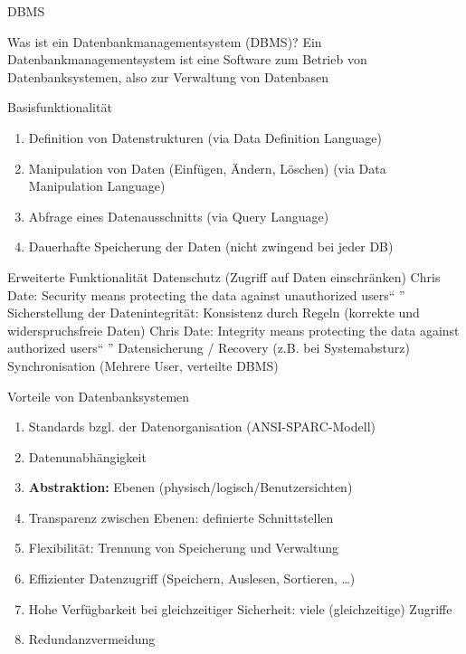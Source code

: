 

\begin{frame}[allowframebreaks]{DBMS}
\begin{alertblock}{Was ist ein Datenbankmanagementsystem (DBMS)?}
Ein Datenbankmanagementsystem ist eine Software zum Betrieb von
Datenbanksystemen, also zur Verwaltung von Datenbasen
\end{alertblock}

\begin{exampleblock}{Basisfunktionalität}
\begin{enumerate}
    \item Definition von Datenstrukturen (via Data Definition Language)
    \item Manipulation von Daten (Einfügen, Ändern, Löschen) (via Data Manipulation Language)
    \item Abfrage  eines Datenausschnitts (via Query Language)
    \item Dauerhafte Speicherung der Daten (nicht zwingend bei jeder DB)
\end{enumerate}
\end{exampleblock}

Erweiterte Funktionalität
Datenschutz (Zugriff auf Daten einschränken)
Chris Date: Security means protecting the data against unauthorized users“
”
Sicherstellung der Datenintegrität: Konsistenz durch Regeln
(korrekte und widerspruchsfreie Daten)
Chris Date: Integrity means protecting the data against authorized users“
”
Datensicherung / Recovery (z.B. bei Systemabsturz)
Synchronisation (Mehrere User, verteilte DBMS)

Vorteile von Datenbanksystemen
\begin{enumerate}
    \item Standards bzgl. der Datenorganisation (ANSI-SPARC-Modell)
    \item Datenunabhängigkeit
    \item \textbf{Abstraktion:} Ebenen (physisch/logisch/Benutzersichten)
    \item Transparenz zwischen Ebenen: definierte Schnittstellen
    \item Flexibilität: Trennung von Speicherung und Verwaltung
    \item Effizienter Datenzugriff (Speichern, Auslesen, Sortieren, \dots)
    \item Hohe Verfügbarkeit bei gleichzeitiger Sicherheit: viele (gleichzeitige) Zugriffe
    \item Redundanzvermeidung
\end{enumerate}
\end{frame}


